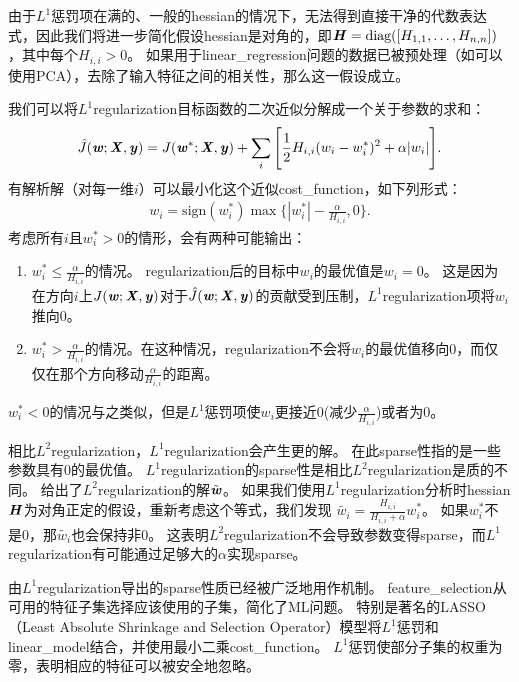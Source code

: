 由于$L^1$惩罚项在满的、一般的\gls{hessian}的情况下，无法得到直接干净的代数表达式，因此我们将进一步简化假设\gls{hessian}是对角的，即$\boldsymbol{\mathit{H}} = \text{diag}([H_{1,1},\dots, H_{n,n}])$，其中每个$H_{i,i}>0$。
如果用于\gls{linear_regression}问题的数据已被预处理（如可以使用PCA），去除了输入特征之间的相关性，那么这一假设成立。

我们可以将$L^1$\gls{regularization}目标函数的二次近似分解成一个关于参数的求和：
\begin{align}
 \hat J(\Vw; \MX, \Vy) = J(\Vw^*; \MX, \Vy) + \sum_i \Bigg [\frac{1}{2} H_{i,i} (w_i - w_i^*)^2 
 + \alpha |w_i| \Bigg].  %
\end{align}
有解析解（对每一维$i$）可以最小化这个近似\gls{cost_function}，如下列形式：
\begin{align}
w_i = \text{sign}(w_i^*) \max\Big\{ |w_i^*| - \frac{\alpha}{H_{i,i}} , 0\Big\} .
\end{align}
考虑所有$i$且$w_i^* > 0$的情形，会有两种可能输出：
\begin{enumerate}
\item $w_i^* \leq \frac{\alpha}{H_{i,i}}$的情况。
\gls{regularization}后的目标中$w_i$的最优值是$w_i = 0$。
这是因为在方向$i$上$J(\boldsymbol{\mathit{w}}; \boldsymbol{\mathit{X}}, \boldsymbol{\mathit{y}}) $对于$ \hat J(\boldsymbol{\mathit{w}}; \boldsymbol{\mathit{X}}, \boldsymbol{\mathit{y}})$的贡献受到压制，$L^1$\gls{regularization}项将$w_i$推向0。
\item  $w_i^* > \frac{\alpha}{H_{i,i}}$的情况。在这种情况，\gls{regularization}不会将$w_i$的最优值移向0，而仅仅在那个方向移动$\frac{\alpha}{H_{i,i}}$的距离。
\end{enumerate}
$w_i^* < 0$的情况与之类似，但是$L^1$惩罚项使$w_i$更接近0(减少$ \frac{\alpha}{H_{i,i}}$)或者为0。

相比$L^2$\gls{regularization}，$L^1$\gls{regularization}会产生更的解。
在此\gls{sparse}性指的是一些参数具有0的最优值。
$L^1$\gls{regularization}的\gls{sparse}性是相比$L^2$\gls{regularization}是质的不同。
给出了$L^2$\gls{regularization}的解$\tilde {\boldsymbol{\mathit{w}}}$。 
如果我们使用$L^1$\gls{regularization}分析时\gls{hessian}$\boldsymbol{\mathit{H}}$为对角正定的假设，重新考虑这个等式，我们发现
$\tilde{w_i} = \frac{H_{i,i}}{H_{i,i} + \alpha} w_i^*$。
如果$w_i^*$不是0，那$\tilde{w_i}$也会保持非0。 
这表明$L^2$\gls{regularization}不会导致参数变得\gls{sparse}，而$L^1$\gls{regularization}有可能通过足够大的$\alpha$实现\gls{sparse}。
 
由$L^1$\gls{regularization}导出的\gls{sparse}性质已经被广泛地用作机制。
\gls{feature_selection}从可用的特征子集选择应该使用的子集，简化了\gls{ML}问题。
特别是著名的LASSO\citep{Tibshirani95}（Least Absolute Shrinkage and
Selection Operator）模型将$L^1$惩罚和\gls{linear_model}结合，并使用最小二乘\gls{cost_function}。 
$L^1$惩罚使部分子集的权重为零，表明相应的特征可以被安全地忽略。
 
